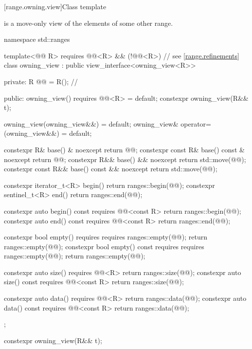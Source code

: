 [range.owning.view]{Class template }

\pnum
{} is a move-only view
of the elements of some other range.
\begin{codeblock}
namespace std::ranges {
  template<@@ R>
    requires @@<R> && (!@@<R>) // see \ref{range.refinements}
  class owning_view : public view_interface<owning_view<R>> {
  private:
    R @@ = R();         // \expos

  public:
    owning_view() requires @@<R> = default;
    constexpr owning_view(R&& t);

    owning_view(owning_view&&) = default;
    owning_view& operator=(owning_view&&) = default;

    constexpr R& base() & noexcept { return @@; }
    constexpr const R& base() const & noexcept { return @@; }
    constexpr R&& base() && noexcept { return std::move(@@); }
    constexpr const R&& base() const && noexcept { return std::move(@@); }

    constexpr iterator_t<R> begin() { return ranges::begin(@@); }
    constexpr sentinel_t<R> end() { return ranges::end(@@); }

    constexpr auto begin() const requires @@<const R>
    { return ranges::begin(@@); }
    constexpr auto end() const requires @@<const R>
    { return ranges::end(@@); }

    constexpr bool empty() requires requires { ranges::empty(@@); }
    { return ranges::empty(@@); }
    constexpr bool empty() const requires requires { ranges::empty(@@); }
    { return ranges::empty(@@); }

    constexpr auto size() requires @@<R>
    { return ranges::size(@@); }
    constexpr auto size() const requires @@<const R>
    { return ranges::size(@@); }

    constexpr auto data() requires @@<R>
    { return ranges::data(@@); }
    constexpr auto data() const requires @@<const R>
    { return ranges::data(@@); }
  };
}
\end{codeblock}

\begin{itemdecl}
constexpr owning_view(R&& t);
\end{itemdecl}

